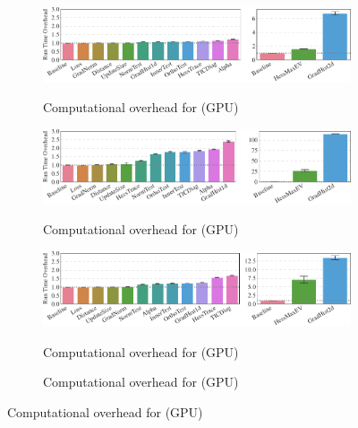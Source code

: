 \captionsetup[subfigure]{justification=justified,singlelinecheck=false}

\begin{figure}[p]
  \vfill
  \begin{subfigure}[t]{\linewidth}
    \caption{Computational overhead for \mnist \MNISTNET (GPU)}
    \includegraphics{../repos/cockpit-paper/fig/01_benchmark/output/fig_individual/benchmark_combined_mnist_logreg_cuda_thesis-wide}
    \label{cockpit::fig:app_benchmark_instruments_cuda-mnist_logreg}
  \end{subfigure}
  \vfill
  \begin{subfigure}[t]{\linewidth}
    \caption{Computational overhead for \mnist \mlp (GPU)}
    \includegraphics{../repos/cockpit-paper/fig/01_benchmark/output/fig_individual/benchmark_combined_mnist_mlp_cuda_thesis-wide}
    \label{cockpit::fig:app_benchmark_instruments_cuda-mnist_mlp}
  \end{subfigure}
  \vfill
  \begin{subfigure}[t]{\linewidth}
    \caption{Computational overhead for \cifarten \threecthreed (GPU)}
    \includegraphics{../repos/cockpit-paper/fig/01_benchmark/output/fig_individual/benchmark_combined_cifar10_3c3d_cuda_thesis-wide}
    \label{cockpit::fig:app_benchmark_instruments_cuda-cifar10}
  \end{subfigure}
  \vfill
  \begin{subfigure}[t]{\linewidth}
    \caption{Computational overhead for \fmnist \twoctwod (GPU)}

\end{subfigure}
\end{figure}
